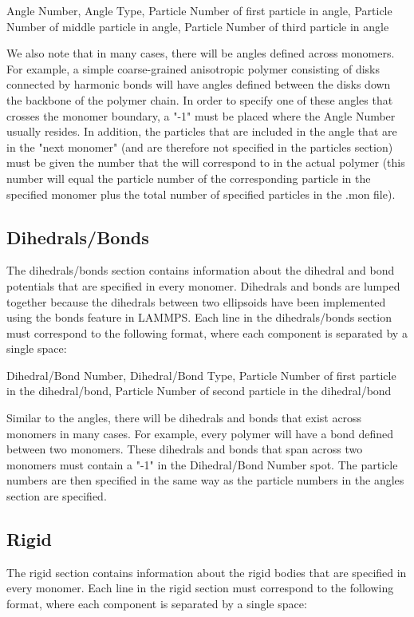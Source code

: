 \documentclass{article}
\begin{document}
Angle Number, Angle Type, Particle Number of first particle in angle, Particle Number of middle particle in angle, Particle Number of third particle in angle

We also note that in many cases, there will be angles defined across monomers. For example, a simple coarse-grained anisotropic polymer consisting of disks connected by harmonic bonds will have angles defined between the disks down the backbone of the polymer chain. In order to specify one of these angles that crosses the monomer boundary, a "-1" must be placed where the Angle Number usually resides. In addition, the particles that are included in the angle that are in the "next monomer" (and are therefore not specified in the particles section) must be given the number that the will correspond to in the actual polymer (this number will equal the particle number of the corresponding particle in the specified monomer plus the total number of specified particles in the .mon file).

\subsection{Dihedrals/Bonds}
The dihedrals/bonds section contains information about the dihedral and bond potentials that are specified in every monomer. Dihedrals and bonds are lumped together because the dihedrals between two ellipsoids have been implemented using the bonds feature in LAMMPS. Each line in the dihedrals/bonds section must correspond to the following format, where each component is separated by a single space:

Dihedral/Bond Number, Dihedral/Bond Type, Particle Number of first particle in the dihedral/bond, Particle Number of second particle in the dihedral/bond

Similar to the angles, there will be dihedrals and bonds that exist across monomers in many cases. For example, every polymer will have a bond defined between two monomers. These dihedrals and bonds that span across two monomers must contain a "-1" in the Dihedral/Bond Number spot. The particle numbers are then specified in the same way as the particle numbers in the angles section are specified.

\subsection{Rigid}
The rigid section contains information about the rigid bodies that are specified in every monomer. Each line in the rigid section must correspond to the following format, where each component is separated by a single space:
\end{document}
